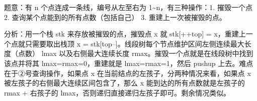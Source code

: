 题意：有 n 个点连成一条线，编号从左至右为 1\~{}n，有三种操作：1. 摧毁一个点 2. 查询某个点能到的所有点数（包括自己） 3. 重建上一次被摧毁的点。

分析：用一个栈 stk 来存放被摧毁的点，摧毁点 x 就 stk[++top] = x，重建上一个点就只需要取出栈顶 x = stk[top--]。线段树每个节点维护区间左侧连续最大长度（点数） lmax 以及右侧最大连续长度 rmax。摧毁一个点就是在线段树中找到该点并将其 lmax=rmax=0，重建就是 lmax=rmax=1，然后 pushup 上去。难点在于②号查询操作，如果点 x 在当前结点的左孩子，分两种情况来看，如果点 x 被左孩子的右侧最大连续区间包含了，那么 x 能到达的所有点数就是左孩子的 rmax + 右孩子的 lmax，否则递归直接递归左孩子即可。剩余情况类似。